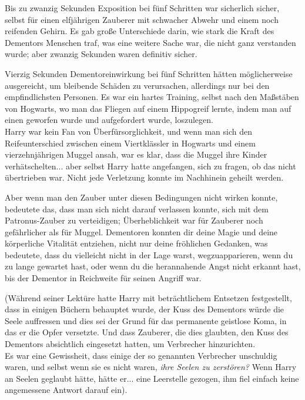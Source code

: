 {Bis zu zwanzig Sekunden Exposition bei fünf Schritten war sicherlich sicher, selbst für einen elfjährigen Zauberer mit schwacher Abwehr und einem noch reifenden Gehirn. Es gab große Unterschiede darin, wie stark die Kraft des Dementors Menschen traf, was eine weitere Sache war, die nicht ganz verstanden wurde; aber zwanzig Sekunden waren definitiv sicher.

Vierzig Sekunden Dementoreinwirkung bei fünf Schritten hätten möglicherweise ausgereicht, um bleibende Schäden zu verursachen, allerdings nur bei den empfindlichsten Personen. Es war ein hartes Training, selbst nach den Maßstäben von Hogwarts, wo man das Fliegen auf einem Hippogreif lernte, indem man auf einen geworfen wurde und aufgefordert wurde, loszulegen.\\ Harry war kein Fan von Überfürsorglichkeit, und wenn man sich den Reifeunterschied zwischen einem Viertklässler in Hogwarts und einem vierzehnjährigen Muggel ansah, war es klar, dass die Muggel ihre Kinder verhätschelten... aber selbst Harry hatte angefangen, sich zu fragen, ob das nicht übertrieben war. Nicht jede Verletzung konnte im Nachhinein geheilt werden.

Aber wenn man den Zauber unter diesen Bedingungen nicht wirken konnte, bedeutete das, dass man sich nicht darauf verlassen konnte, sich mit dem Patronus-Zauber zu verteidigen; Überheblichkeit war für Zauberer noch gefährlicher als für Muggel. Dementoren konnten dir deine Magie und deine körperliche Vitalität entziehen, nicht nur deine fröhlichen Gedanken, was bedeutete, dass du vielleicht nicht in der Lage warst, wegzuapparieren, wenn du zu lange gewartet hast, oder wenn du die herannahende Angst nicht erkannt hast, bis der Dementor in Reichweite für seinen Angriff war.

(Während seiner Lektüre hatte Harry mit beträchtlichem Entsetzen festgestellt, dass in einigen Büchern behauptet wurde, der Kuss des Dementors würde die Seele auffressen und dies sei der Grund für das permanente geistlose Koma, in das er die Opfer versetzte. Und dass Zauberer, die dies glaubten, den Kuss des Dementors absichtlich eingesetzt hatten, um Verbrecher hinzurichten.\\ Es war eine Gewissheit, dass einige der so genannten Verbrecher unschuldig waren, und selbst wenn sie es nicht waren, \emph{ihre Seelen zu zerstören?} Wenn Harry an Seelen geglaubt hätte, hätte er... eine Leerstelle gezogen, ihm fiel einfach keine angemessene Antwort darauf ein).

}
